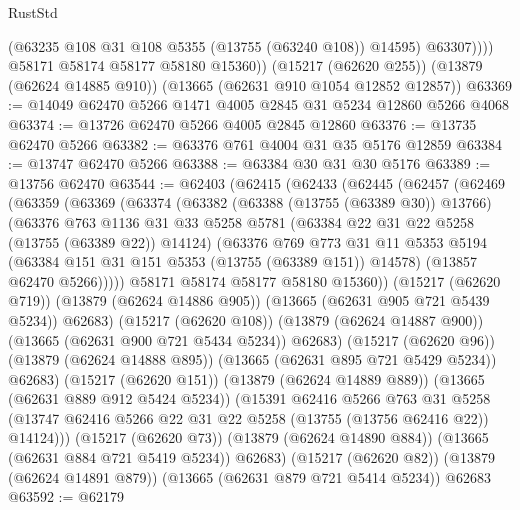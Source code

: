 \begin{lexlean}{RustStd}
\begin{coremodule}
                (@63235 @108 @31 @108 @5355 (@13755 (@63240 @108)) @14595)
                @63307))))
        @58171
        @58174
        @58177
        @58180
        @15360))
    (@15217 (@62620 @255))
    (@13879 (@62624 @14885 @910))
    (@13665 (@62631 @910 @1054 @12852 @12857))
@63369 := @14049 @62470 @5266 @1471 @4005 @2845 @31 @5234 @12860 @5266 @4068
@63374 := @13726 @62470 @5266 @4005 @2845 @12860
@63376 := @13735 @62470 @5266
@63382 := @63376 @761 @4004 @31 @35 @5176 @12859
@63384 := @13747 @62470 @5266
@63388 := @63384 @30 @31 @30 @5176
@63389 := @13756 @62470
@63544 := @62403
    (@62415
      (@62433
        (@62445
          (@62457
            (@62469
              (@63359
                (@63369
                  (@63374
                    (@63382
                      (@63388 (@13755 (@63389 @30)) @13766)
                      (@63376
                        @763
                        @1136
                        @31
                        @33
                        @5258
                        @5781
                        (@63384 @22 @31 @22 @5258 (@13755 (@63389 @22)) @14124)
                        (@63376
                          @769
                          @773
                          @31
                          @11
                          @5353
                          @5194
                          (@63384 @151 @31 @151 @5353 (@13755 (@63389 @151)) @14578)
                          (@13857 @62470 @5266)))))
                  @58171
                  @58174
                  @58177
                  @58180
                  @15360))
              (@15217 (@62620 @719))
              (@13879 (@62624 @14886 @905))
              (@13665 (@62631 @905 @721 @5439 @5234))
              @62683)
            (@15217 (@62620 @108))
            (@13879 (@62624 @14887 @900))
            (@13665 (@62631 @900 @721 @5434 @5234))
            @62683)
          (@15217 (@62620 @96))
          (@13879 (@62624 @14888 @895))
          (@13665 (@62631 @895 @721 @5429 @5234))
          @62683)
        (@15217 (@62620 @151))
        (@13879 (@62624 @14889 @889))
        (@13665 (@62631 @889 @912 @5424 @5234))
        (@15391
          @62416
          @5266
          @763
          @31
          @5258
          (@13747 @62416 @5266 @22 @31 @22 @5258 (@13755 (@13756 @62416 @22)) @14124)))
      (@15217 (@62620 @73))
      (@13879 (@62624 @14890 @884))
      (@13665 (@62631 @884 @721 @5419 @5234))
      @62683)
    (@15217 (@62620 @82))
    (@13879 (@62624 @14891 @879))
    (@13665 (@62631 @879 @721 @5414 @5234))
    @62683
@63592 := @62179

\end{coremodule}
\end{lexlean}
